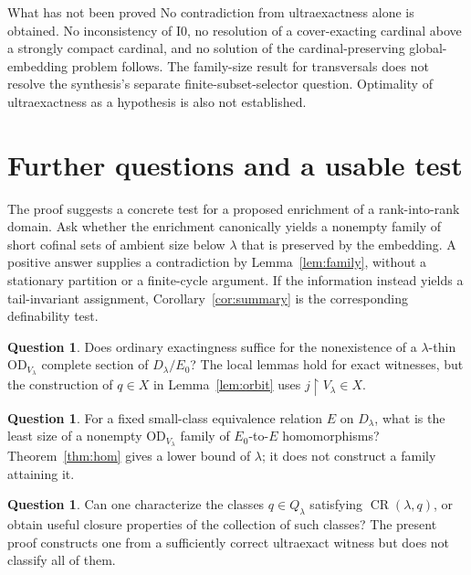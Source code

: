 \documentclass[11pt,letterpaper]{article}
\theoremstyle{definition}
\newtheorem{question}[definition]{Question}
\numberwithin{equation}{section}
\newcommand{\OD}{\mathrm{OD}}
\newcommand{\restr}{\mathbin{\upharpoonright}}
\newcommand{\Izero}{\mathrm{I0}}
\newcommand{\D}{D_\lambda}
\newcommand{\Q}{Q_\lambda}
\newcommand{\ODlow}{\OD_{V_\lambda}}
\newcommand{\Rig}{\operatorname{CR}}
\begin{document}
\begin{assessment}{What has not been proved}
No contradiction from ultraexactness alone is obtained. No inconsistency of $\Izero$, no resolution of a cover-exacting cardinal above a strongly compact cardinal, and no solution of the cardinal-preserving global-embedding problem follows. The family-size result for transversals does not resolve the synthesis's separate finite-subset-selector question. Optimality of ultraexactness as a hypothesis is also not established.
\end{assessment}

\section{Further questions and a usable test}\label{sec:questions}

The proof suggests a concrete test for a proposed enrichment of a rank-into-rank domain. Ask whether the enrichment canonically yields a nonempty family of short cofinal sets of ambient size below $\lambda$ that is preserved by the embedding. A positive answer supplies a contradiction by Lemma~\ref{lem:family}, without a stationary partition or a finite-cycle argument. If the information instead yields a tail-invariant assignment, Corollary~\ref{cor:summary} is the corresponding definability test.

\begin{question}
Does ordinary exactingness suffice for the nonexistence of a $\lambda$-thin $\ODlow$ complete section of $\D/E_0$? The local lemmas hold for exact witnesses, but the construction of $q\in X$ in Lemma~\ref{lem:orbit} uses $j\restr V_\lambda\in X$.
\end{question}

\begin{question}
For a fixed small-class equivalence relation $E$ on $\D$, what is the least size of a nonempty $\ODlow$ family of $E_0$-to-$E$ homomorphisms? Theorem~\ref{thm:hom} gives a lower bound of $\lambda$; it does not construct a family attaining it.
\end{question}

\begin{question}
Can one characterize the classes $q\in\Q$ satisfying $\Rig(\lambda,q)$, or obtain useful closure properties of the collection of such classes? The present proof constructs one from a sufficiently correct ultraexact witness but does not classify all of them.
\end{question}
\end{document}
